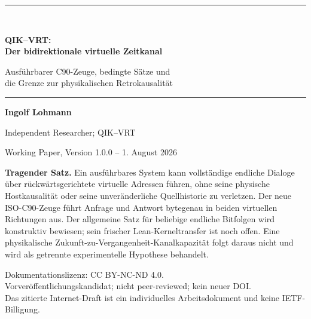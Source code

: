\documentclass[11pt,a4paper]{article}
\theoremstyle{remark}
\newcommand{\statusbox}[2]{%
  \par\medskip\noindent
  \colorbox{#1}{\parbox{\dimexpr\linewidth-2\fboxsep\relax}{#2}}%
  \par\medskip
}
\begin{document}
\hypersetup{pageanchor=false}
\begin{titlepage}
  \thispagestyle{empty}
  \vspace*{12mm}
  {\color{QBlue}\rule{\textwidth}{1.4pt}}\\[1.0em]
  {\Huge\bfseries QIK--VRT:\\[0.18em]
  Der bidirektionale virtuelle Zeitkanal\par}
  \vspace{0.9em}
  {\LARGE Ausführbarer C90-Zeuge, bedingte Sätze und\\
  die Grenze zur physikalischen Retrokausalität\par}
  \vspace{1.0em}
  {\color{QBlue}\rule{\textwidth}{0.6pt}}

  \vfill
  {\large\textbf{Ingolf Lohmann}\par}
  \vspace{0.35em}
  {\normalsize Independent Researcher; QIK--VRT\par}
  \vspace{0.35em}
  {\normalsize Working Paper, Version 1.0.0 -- 1. August 2026\par}

  \vfill
  \statusbox{QLight}{
    \textbf{Tragender Satz.}
    Ein ausführbares System kann vollständige endliche Dialoge über
    rückwärtsgerichtete virtuelle Adressen führen, ohne seine physische
    Hostkausalität oder seine unveränderliche Quellhistorie zu verletzen.
    Der neue ISO-C90-Zeuge führt Anfrage und Antwort bytegenau in beiden
    virtuellen Richtungen aus. Der allgemeine Satz für beliebige endliche
    Bitfolgen wird konstruktiv bewiesen; sein frischer Lean-Kerneltransfer ist
    noch offen. Eine physikalische Zukunft-zu-Vergangenheit-Kanalkapazität
    folgt daraus nicht und wird als getrennte experimentelle Hypothese
    behandelt.
  }

  \vfill
  {\small
    Dokumentationslizenz: CC BY-NC-ND 4.0.\\
    Vorveröffentlichungskandidat; nicht peer-reviewed; kein neuer DOI.\\
    Das zitierte Internet-Draft ist ein individuelles Arbeitsdokument und
    keine IETF-Billigung.
  }
\end{titlepage}
\hypersetup{pageanchor=true}
\setcounter{page}{1}

\end{document}
